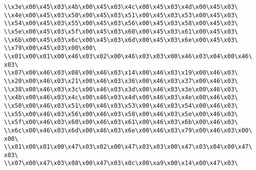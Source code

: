 \verb|\\x3e\x00\x45\x03\x4b\x00\x45\x03\x4c\x00\x45\x03\x4d\x00\x45\x03\|\newline
\verb|\\x4e\x00\x45\x03\x50\x00\x45\x03\x51\x00\x45\x03\x53\x00\x45\x03\|\newline
\verb|\\x54\x00\x45\x03\x55\x00\x45\x03\x56\x00\x45\x03\x58\x00\x45\x03\|\newline
\verb|\\x5e\x00\x45\x03\x5f\x00\x45\x03\x60\x00\x45\x03\x61\x00\x45\x03\|\newline
\verb|\\x6b\x00\x45\x03\x6c\x00\x45\x03\x6d\x00\x45\x03\x6e\x00\x45\x03\|\newline
\verb|\\x79\x00\x45\x03\x00\x00\|\newline
\verb|\\x01\x00\x01\x00\x46\x03\x02\x00\x46\x03\x03\x00\x46\x03\x04\x00\x46\x03\|\newline
\verb|\\x07\x00\x46\x03\x08\x00\x46\x03\x14\x00\x46\x03\x19\x00\x46\x03\|\newline
\verb|\\x20\x00\x46\x03\x21\x00\x46\x03\x36\x00\x46\x03\x37\x00\x46\x03\|\newline
\verb|\\x38\x00\x46\x03\x3c\x00\x46\x03\x3d\x00\x46\x03\x3e\x00\x46\x03\|\newline
\verb|\\x4b\x00\x46\x03\x4c\x00\x46\x03\x4d\x00\x46\x03\x4e\x00\x46\x03\|\newline
\verb|\\x50\x00\x46\x03\x51\x00\x46\x03\x53\x00\x46\x03\x54\x00\x46\x03\|\newline
\verb|\\x55\x00\x46\x03\x56\x00\x46\x03\x58\x00\x46\x03\x5e\x00\x46\x03\|\newline
\verb|\\x5f\x00\x46\x03\x60\x00\x46\x03\x61\x00\x46\x03\x6b\x00\x46\x03\|\newline
\verb|\\x6c\x00\x46\x03\x6d\x00\x46\x03\x6e\x00\x46\x03\x79\x00\x46\x03\x00\x00\|\newline
\verb|\\x01\x00\x01\x00\x47\x03\x02\x00\x47\x03\x03\x00\x47\x03\x04\x00\x47\x03\|\newline
\verb|\\x07\x00\x47\x03\x08\x00\x47\x03\x0c\x00\xa9\x00\x14\x00\x47\x03\|\newline
